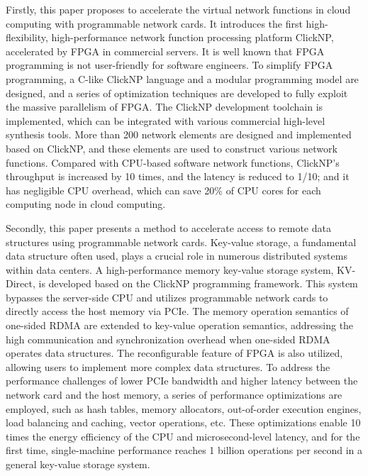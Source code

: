 Firstly, this paper proposes to accelerate the virtual network functions in cloud computing with programmable network cards. It introduces the first high-flexibility, high-performance network function processing platform ClickNP, accelerated by FPGA in commercial servers. It is well known that FPGA programming is not user-friendly for software engineers. To simplify FPGA programming, a C-like ClickNP language and a modular programming model are designed, and a series of optimization techniques are developed to fully exploit the massive parallelism of FPGA. The ClickNP development toolchain is implemented, which can be integrated with various commercial high-level synthesis tools. More than 200 network elements are designed and implemented based on ClickNP, and these elements are used to construct various network functions. Compared with CPU-based software network functions, ClickNP's throughput is increased by 10 times, and the latency is reduced to 1/10; and it has negligible CPU overhead, which can save 20\% of CPU cores for each computing node in cloud computing.

Secondly, this paper presents a method to accelerate access to remote data structures using programmable network cards. Key-value storage, a fundamental data structure often used, plays a crucial role in numerous distributed systems within data centers. A high-performance memory key-value storage system, KV-Direct, is developed based on the ClickNP programming framework. This system bypasses the server-side CPU and utilizes programmable network cards to directly access the host memory via PCIe. The memory operation semantics of one-sided RDMA are extended to key-value operation semantics, addressing the high communication and synchronization overhead when one-sided RDMA operates data structures. The reconfigurable feature of FPGA is also utilized, allowing users to implement more complex data structures. To address the performance challenges of lower PCIe bandwidth and higher latency between the network card and the host memory, a series of performance optimizations are employed, such as hash tables, memory allocators, out-of-order execution engines, load balancing and caching, vector operations, etc. These optimizations enable 10 times the energy efficiency of the CPU and microsecond-level latency, and for the first time, single-machine performance reaches 1 billion operations per second in a general key-value storage system.

